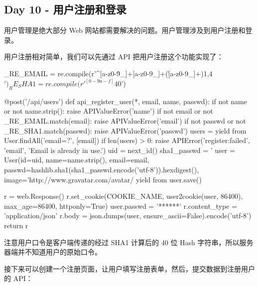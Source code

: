 \hypertarget{day-10---ux7528ux6237ux6ce8ux518cux548cux767bux5f55}{%
\subsection{Day 10 -
用户注册和登录}\label{day-10---ux7528ux6237ux6ce8ux518cux548cux767bux5f55}}

用户管理是绝大部分 Web
网站都需要解决的问题。用户管理涉及到用户注册和登录。

用户注册相对简单，我们可以先通过 API 把用户注册这个功能实现了：

\begin{pythoncode}
_RE_EMAIL = re.compile(r'^[a-z0-9\.\-\_]+\@[a-z0-9\-\_]+(\.[a-z0-9\-\_]+){1,4}$')
_RE_SHA1 = re.compile(r'^[0-9a-f]{40}$')

@post('/api/users')
def api_register_user(*, email, name, passwd):
    if not name or not name.strip():
        raise APIValueError('name')
    if not email or not _RE_EMAIL.match(email):
        raise APIValueError('email')
    if not passwd or not _RE_SHA1.match(passwd):
        raise APIValueError('passwd')
    users = yield from User.findAll('email=?', [email])
    if len(users) > 0:
        raise APIError('register:failed', 'email', 'Email is already in use.')
    uid = next_id()
    sha1_passwd = '%
    user = User(id=uid, name=name.strip(), email=email, passwd=hashlib.sha1(sha1_passwd.encode('utf-8')).hexdigest(), image='http://www.gravatar.com/avatar/%
    yield from user.save()
    
    r = web.Response()
    r.set_cookie(COOKIE_NAME, user2cookie(user, 86400), max_age=86400, httponly=True)
    user.passwd = '******'
    r.content_type = 'application/json'
    r.body = json.dumps(user, ensure_ascii=False).encode('utf-8')
    return r
\end{pythoncode}

注意用户口令是客户端传递的经过 SHA1 计算后的 40 位 Hash
字符串，所以服务器端并不知道用户的原始口令。

接下来可以创建一个注册页面，让用户填写注册表单，然后，提交数据到注册用户的
API：

